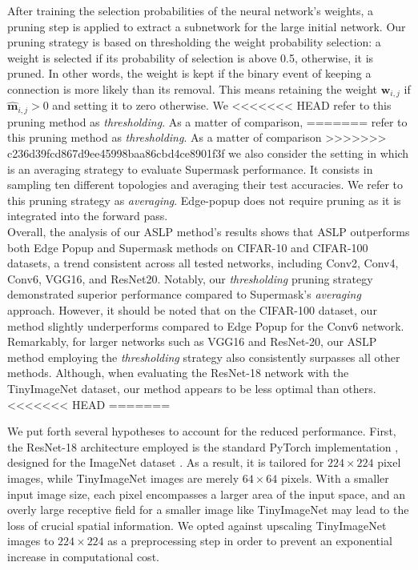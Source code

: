After training the selection probabilities of the neural network's weights, a
pruning step is applied to extract a subnetwork for the large initial network.
Our pruning strategy is based on thresholding the weight probability selection:
a weight is selected if its probability of selection is above 0.5, otherwise, it
is pruned. In other words, the weight is kept if the binary event of keeping a
connection is more likely than its removal. This means retaining the weight
$\bm{w}_{i,j}$ if $\bm{\hat{m}}_{i,j} > 0$ and setting it to zero otherwise. We
<<<<<<< HEAD
refer to this pruning method as \textit{thresholding}. As a matter of comparison,
=======
refer to this pruning method as \textit{thresholding}. As a matter of comparison
>>>>>>> c236d39fcd867d9ee45998baa86cbd4ce8901f3f
we also consider the setting in \citeauthor{DBLP:conf/nips/ZhouLLY19} which is
an averaging strategy to evaluate Supermask performance. It consists in sampling
ten different topologies and averaging their test accuracies. We refer to this
pruning strategy as \textit{averaging}. Edge-popup does not require pruning as it
is integrated into the forward pass. \\

Overall, the analysis of our ASLP method's results shows that ASLP outperforms
both Edge Popup and Supermask methods on CIFAR-10 and CIFAR-100 datasets, a
trend consistent across all tested networks, including Conv2, Conv4, Conv6,
VGG16, and ResNet20. Notably, our \textit{thresholding} pruning strategy
demonstrated superior performance compared to Supermask's \textit{averaging}
approach. However, it should be noted that on the CIFAR-100 dataset, our method
slightly underperforms compared to Edge Popup for the Conv6 network.\\

Remarkably, for larger networks such as VGG16 and ResNet-20, our ASLP method
employing the \textit{thresholding} strategy also consistently surpasses all
other methods. Although, when evaluating the ResNet-18 network with the
TinyImageNet dataset, our method appears to be less optimal than others. \\
<<<<<<< HEAD
=======


We put forth several hypotheses to account for the reduced performance. First,
the ResNet-18 architecture employed is the standard PyTorch implementation
\cite{pytorch_resnet18}, designed for the ImageNet dataset
\cite{deng2009imagenet}. As a result, it is tailored for $224 \times 224$ pixel
images, while TinyImageNet images are merely $64 \times 64$ pixels. With a
smaller input image size, each pixel encompasses a larger area of the input
space, and an overly large receptive field for a smaller image like TinyImageNet
may lead to the loss of crucial spatial information. We opted against upscaling
TinyImageNet images to $224 \times 224$ as a preprocessing step in order to
prevent an exponential increase in computational cost.\\

